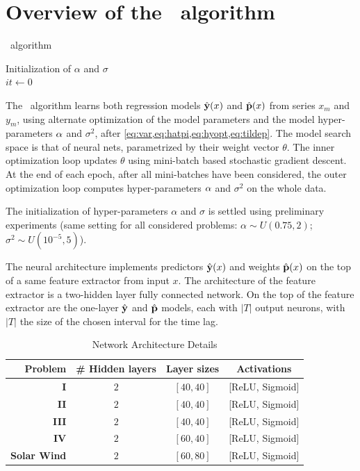 \section{Overview of the \XX\ algorithm}\label{sec:model}
\begin{algorithm}[H]
  \SetAlgoLined
   \caption{\XX\ algorithm}
   Initialization of $\alpha$ and $\sigma$\\
   $it \longleftarrow 0$ \;
\end{algorithm}
The \XX\ algorithm learns both regression models $\hat {\bf y}(x)$ and $\hat {\bf p}(x)$ from 
series $x_m$ and $y_m$, using alternate optimization of the model parameters and the model 
hyper-parameters ${\bf \alpha}$ and $\sigma^2$, after \cref{eq:var,eq:hatpi,eq:hyopt,eq:tildep}. 
The model search space is that of neural nets, parametrized by their weight vector $\theta$. 
The inner optimization loop updates $\theta$ using mini-batch based stochastic gradient descent. 
At the end of each epoch, after all mini-batches have been considered, the outer optimization loop 
computes hyper-parameters ${\bf \alpha}$ and $\sigma^2$ on the whole data. 
 
The initialization of hyper-parameters $\alpha$ and $\sigma$ is settled using preliminary 
experiments (same setting for all considered problems: 
$\alpha \sim U(0.75, 2)$; $\sigma^2 \sim U(10^{-5}, 5)$).

The neural architecture implements predictors $\hat {\bf y}(x)$ and weights $\hat {\bf p}(x)$ on 
the top of a same feature extractor from input $x$. The architecture of the feature extractor is a 
two-hidden layer fully connected network. On the top of the feature extractor are the 
one-layer $\hat {\bf y}$ and $\hat {\bf p}$ models, each with $|T|$ output neurons, with $|T|$ the 
size of the chosen interval for the time lag.

\begin{table}[htbp]
  \caption{Network Architecture Details}\label{tab:arch_probs}
  \centering
  \begin{tabular}{ r c c c }
  \hline
  Problem &  \# Hidden layers & Layer sizes & Activations\\
  \hline
  \textbf{I} & $2$ & $[40, 40]$  & [ReLU, Sigmoid]\\
  \textbf{II} & $2$ & $[40, 40]$ & [ReLU, Sigmoid]\\
  \textbf{III} & $2$ & $[40, 40]$ & [ReLU, Sigmoid]\\
  \textbf{IV} & $2$ & $[60, 40]$ & [ReLU, Sigmoid]\\
  \textbf{Solar Wind} & $2$ & $[60, 80]$ & [ReLU, Sigmoid]\\
  \hline
  \end{tabular}
\end{table}


